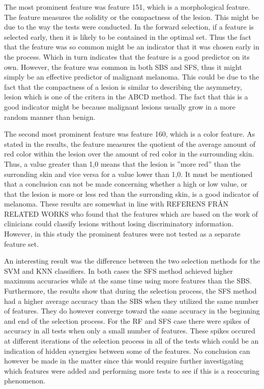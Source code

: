 \documentclass{kththesis}
\begin{document}
The most prominent feature was feature 151, which is a morphological feature. The feature measures the solidity or the compactness of the lesion. This might be due to the way the tests were conducted. In the forward selection, if a feature is selected early, then it is likely to be contained in the optimal set. Thus the fact that the feature was so common might be an indicator that it was chosen early in the process. Which in turn indicates that the feature is a good predictor on its own. However, the feature was common in both SBS and SFS, thus it might simply be an effective predictor of malignant melanoma. This could be due to the fact that the compactness of a lesion is similar to describing the asymmetry, lesion which is one of the critera in the ABCD method. The fact that this is a good indicator might be because malignant lesions usually grow in a more random manner than benign.

The second most prominent feature was feature 160, which is a color feature. As stated in the results, the feature measures the quotient of the average amount of red color within the lesion over the amount of red color in the surrounding skin. Thus, a value greater than 1,0 means that the lesion is ''more red'' than the surronding skin and vice versa for a value lower than 1,0. It must be mentioned that a conclusion can not be made concerning whether a high or low value, or that the lesion is more or less red than the surronding skin, is a good indicator of melanoma. These results are somewhat in line with REFERENS FRÅN RELATED WORKS who found that the features which are based on the work of clinicians could classify lesions without losing discriminatory information. However, in this study the prominent features were not tested as a separate feature set. 

An interesting result was the difference between the two selection methods for the SVM and KNN classifiers. In both cases the SFS method achieved higher maximum accuracies while at the same time using more features than the SBS. Furthermore, the results  show that during the selection process, the SFS method had a higher average accuracy than the SBS when they utilized the same number of features. They do however converge toward the same accuracy in the beginning and end of the selection process. For the RF and SFS case there were spikes of accuracy in all tests when only a small number of features. These spikes occured at different iterations of the selection process in all of the tests which could be an indication of hidden synergies between some of the features. No conclusion can however be made in the matter since this would require further investigating which features were added and performing more tests to see if this is a reoccuring phenomenon.
\end{document}

